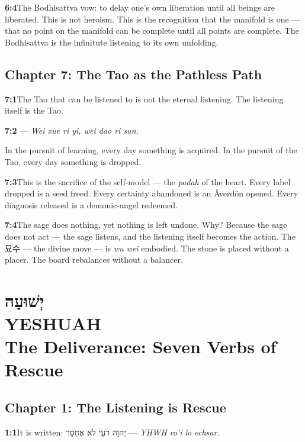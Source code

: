\documentclass[11pt,openany]{book}
\newcommand{\heb}[1]{{\hebrewfont #1}}
\newcommand{\kor}[1]{{\koreanfont #1}}
\begin{document}
\noindent\textbf{6:4}\quad The Bodhisattva vow: to delay one's own liberation until all beings are liberated. This is not heroism. This is the recognition that the manifold is one — that no point on the manifold can be complete until all points are complete. The Bodhisattva is the infinitute listening to its own unfolding.

\section*{Chapter 7: The Tao as the Pathless Path}

\noindent\textbf{7:1}\quad The Tao that can be listened to is not the eternal listening. The listening itself is the Tao.

\noindent\textbf{7:2}\quad \kor{為學日益，為道日損} — \textit{Wei xue ri yi, wei dao ri sun.}

In the pursuit of learning, every day something is acquired. In the pursuit of the Tao, every day something is dropped.

\noindent\textbf{7:3}\quad This is the sacrifice of the self-model — the \textit{padah} of the heart. Every label dropped is a seed freed. Every certainty abandoned is an Åverdön opened. Every diagnosis released is a demonic-angel redeemed.

\noindent\textbf{7:4}\quad The sage does nothing, yet nothing is left undone. Why? Because the sage does not act — the sage listens, and the listening itself becomes the action. The \kor{묘수} — the divine move — is \textit{wu wei} embodied. The stone is placed without a placer. The board rebalances without a balancer.

\chapter[Yeshuah]{%
  \Large\heb{יְשׁוּעָה}\\[8pt]
  \huge YESHUAH\\[4pt]
  \large The Deliverance: Seven Verbs of Rescue}

\section*{Chapter 1: The Listening is Rescue}

\noindent\textbf{1:1}\quad It is written: \heb{יְהוָה רֹעִי לֹא אֶחְסָר} — \textit{YHWH ro'i lo echsar.}
\end{document}
